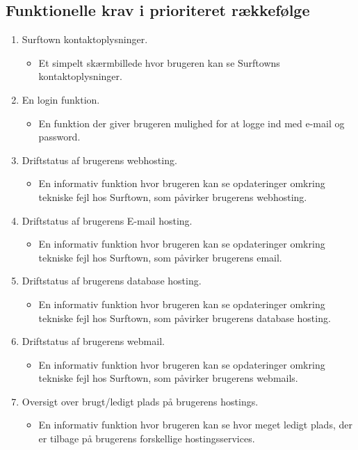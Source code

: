 \documentclass[12pt]{article}
\begin{document}
\subsection*{Funktionelle krav i prioriteret rækkefølge}
\label{functionlist}
\begin{enumerate}
  \item{Surftown kontaktoplysninger.}
	\begin{itemize}
		\item{Et simpelt skærmbillede hvor brugeren kan se Surftowns kontaktoplysninger.}
	\end{itemize}
  \item{En login funktion.}
	\begin{itemize}
		\item{En funktion der giver brugeren mulighed for at logge ind med e-mail og password.}
	\end{itemize}
  \item{Driftstatus af brugerens webhosting.}
	\begin{itemize}
		\item{En informativ funktion hvor brugeren kan se opdateringer omkring tekniske fejl hos Surftown, som påvirker brugerens webhosting.}
	\end{itemize}
  \item{Driftstatus af brugerens E-mail hosting.}
	\begin{itemize}
		\item{En informativ funktion hvor brugeren kan se opdateringer omkring tekniske fejl hos Surftown, som påvirker brugerens email.}
	\end{itemize}
  \item{Driftstatus af brugerens database hosting.}
	\begin{itemize}
		\item{En informativ funktion hvor brugeren kan se opdateringer omkring tekniske fejl hos Surftown, som påvirker brugerens database hosting.}
	\end{itemize}
  \item{Driftstatus af brugerens webmail.}
	\begin{itemize}
		\item{En informativ funktion hvor brugeren kan se opdateringer omkring tekniske fejl hos Surftown, som påvirker brugerens webmails.}
	\end{itemize}
  \item{Oversigt over brugt/ledigt plads på brugerens hostings.}
	\begin{itemize}
		\item{En informativ funktion hvor brugeren kan se hvor meget ledigt plads, der er tilbage på brugerens forskellige hostingsservices.}

\end{itemize}
\end{enumerate}
\end{document}
